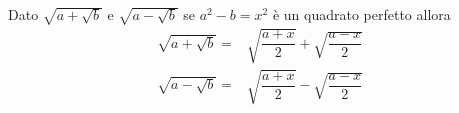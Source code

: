 \begin{cor}\label{cor:quadratoperfetto}
	Dato $\sqrt{a+\sqrt{b}}$ e $\sqrt{a-\sqrt{b}}$ se $a^2-b=x^2$ è un quadrato perfetto allora
	\begin{align*}
	\sqrt{a+\sqrt{b}}=&\sqrt{\dfrac{a+x}{2}}+\sqrt{\dfrac{a-x}{2}}\\
	\sqrt{a-\sqrt{b}}=&\sqrt{\dfrac{a+x}{2}}-\sqrt{\dfrac{a-x}{2}}\\
	\end{align*}
\end{cor}